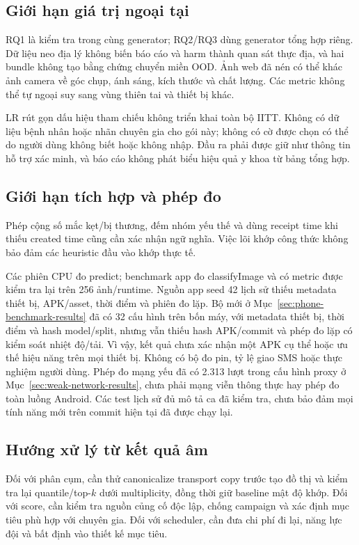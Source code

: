 \subsection{Giới hạn giá trị ngoại tại}
RQ1 là kiểm tra trong cùng generator; RQ2/RQ3 dùng generator tổng hợp riêng. Dữ liệu neo địa lý không biến báo cáo và harm thành quan sát thực địa, và hai bundle không tạo bằng chứng chuyển miền OOD. Ảnh web đã nén có thể khác ảnh camera về góc chụp, ánh sáng, kích thước và chất lượng. Các metric không thể tự ngoại suy sang vùng thiên tai và thiết bị khác.

LR rút gọn dấu hiệu tham chiếu không triển khai toàn bộ IITT. Không có dữ liệu bệnh nhân hoặc nhãn chuyên gia cho gói này; không có cờ được chọn có thể do người dùng không biết hoặc không nhập. Đầu ra phải được giữ như thông tin hỗ trợ xác minh, và báo cáo không phát biểu hiệu quả y khoa từ bảng tổng hợp.

\subsection{Giới hạn tích hợp và phép đo}
Phép cộng số mắc kẹt/bị thương, đếm nhóm yếu thế và dùng receipt time khi thiếu created time cũng cần xác nhận ngữ nghĩa. Việc lõi khớp công thức không bảo đảm các heuristic đầu vào khớp thực tế.

Các phiên CPU đo predict; benchmark app đo classifyImage và có metric được kiểm tra lại trên 256 ảnh/runtime. Nguồn app seed 42 lịch sử thiếu metadata thiết bị, APK/asset, thời điểm và phiên đo lặp. Bộ mới ở Mục~\ref{sec:phone-benchmark-results} đã có 32 cấu hình trên bốn máy, với metadata thiết bị, thời điểm và hash model/split, nhưng vẫn thiếu hash APK/commit và phép đo lặp có kiểm soát nhiệt độ/tải. Vì vậy, kết quả chưa xác nhận một APK cụ thể hoặc ưu thế hiệu năng trên mọi thiết bị. Không có bộ đo pin, tỷ lệ giao SMS hoặc thực nghiệm người dùng. Phép đo mạng yếu đã có 2.313 lượt trong cấu hình proxy ở Mục~\ref{sec:weak-network-results}, chưa phải mạng viễn thông thực hay phép đo toàn luồng Android. Các test lịch sử đủ mô tả ca đã kiểm tra, chưa bảo đảm mọi tính năng mới trên commit hiện tại đã được chạy lại.

\subsection{Hướng xử lý từ kết quả âm}
Đối với phân cụm, cần thử canonicalize transport copy trước tạo đồ thị và kiểm tra lại quantile/top-$k$ dưới multiplicity, đồng thời giữ baseline mật độ khớp. Đối với score, cần kiểm tra nguồn củng cố độc lập, chống campaign và xác định mục tiêu phù hợp với chuyên gia. Đối với scheduler, cần đưa chi phí đi lại, năng lực đội và bất định vào thiết kế mục tiêu.

